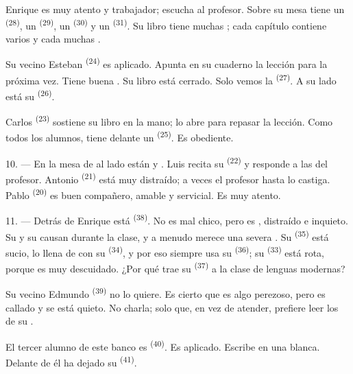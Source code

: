 Enrique es muy atento y trabajador; escucha al profesor. Sobre su mesa
tiene un  \textsuperscript{(28)}, un  \textsuperscript{(29)},
un  \textsuperscript{(30)} y un  \textsuperscript{(31)}.
Su libro tiene muchas ; cada capítulo contiene varios
 y cada  muchas .

Su vecino Esteban \textsuperscript{(24)} es aplicado. Apunta en su cuaderno la
lección para la próxima vez. Tiene buena . Su libro está
cerrado. Solo vemos la  \textsuperscript{(27)}. A su lado está su
 \textsuperscript{(26)}.

Carlos \textsuperscript{(23)} sostiene su libro en la mano; lo abre para repasar
la lección. Como todos los alumnos, tiene delante un 
\textsuperscript{(25)}. Es obediente.

10. --- En la mesa de al lado están  y .
Luis recita su  \textsuperscript{(22)} y responde a las
 del profesor. Antonio \textsuperscript{(21)} está muy distraído;
a veces el profesor hasta lo castiga. Pablo \textsuperscript{(20)} es buen
compañero, amable y servicial. Es muy atento.

\VUsaut{4.2mm}
\VUsaut{3.2mm}

11. --- Detrás de Enrique está  \textsuperscript{(38)}. No es mal
chico, pero es , distraído e inquieto. Su
 y su  causan  durante
la clase, y a menudo merece una severa . Su
 \textsuperscript{(35)} está sucio, lo llena de
 con su  \textsuperscript{(34)}, y por eso
siempre usa su  \textsuperscript{(36)}; su 
\textsuperscript{(33)} está rota, porque es muy descuidado. ¿Por qué trae su
 \textsuperscript{(37)} a la clase de lenguas modernas?

Su vecino Edmundo \textsuperscript{(39)} no lo quiere. Es cierto que es algo
perezoso, pero es callado y se está quieto. No charla; solo que, en vez
de atender, prefiere leer los  de su .

El tercer alumno de este banco es  \textsuperscript{(40)}. Es
aplicado. Escribe en una  blanca. Delante de él ha
dejado su  \textsuperscript{(41)}.

